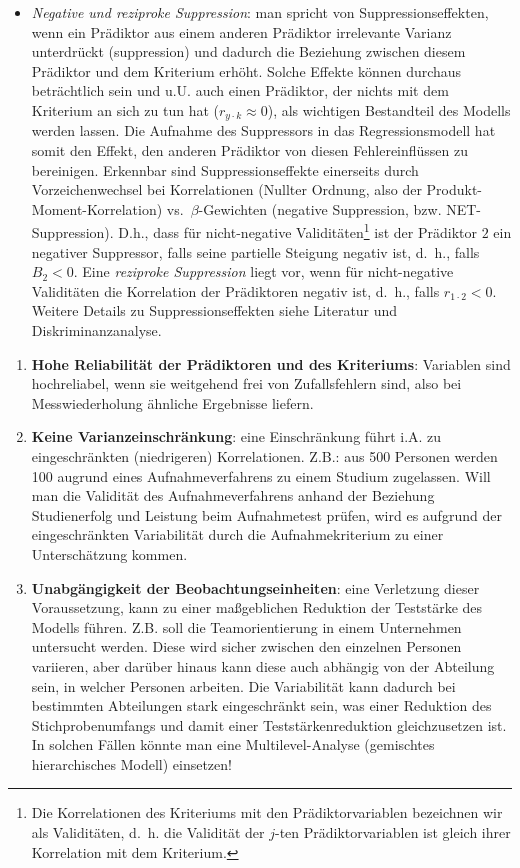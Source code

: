 \documentclass[]{article}
\providecommand{\tightlist}{%
  \setlength{\itemsep}{0pt}\setlength{\parskip}{0pt}}
\let\rmarkdownfootnote\footnote%
\def\footnote{\protect\rmarkdownfootnote}
\begin{document}
\begin{enumerate}
  \begin{itemize}
  \tightlist
  \item
    \emph{Negative und reziproke Suppression}: man spricht von Suppressionseffekten, wenn ein Prädiktor aus einem anderen Prädiktor irrelevante Varianz unterdrückt (suppression) und dadurch die Beziehung zwischen diesem Prädiktor und dem Kriterium erhöht. Solche Effekte können durchaus beträchtlich sein und u.U. auch einen Prädiktor, der nichts mit dem Kriterium an sich zu tun hat (\(r_{y\cdot k} \approx 0\)), als wichtigen Bestandteil des Modells werden lassen. Die Aufnahme des Suppressors in das Regressionsmodell hat somit den Effekt, den anderen Prädiktor von diesen Fehlereinflüssen zu bereinigen. Erkennbar sind Suppressionseffekte einerseits durch Vorzeichenwechsel bei Korrelationen (Nullter Ordnung, also der Produkt-Moment-Korrelation) vs.~\(\beta\)-Gewichten (negative Suppression, bzw. NET-Suppression). D.h., dass für nicht-negative Validitäten\footnote{Die Korrelationen des Kriteriums mit den Prädiktorvariablen bezeichnen wir als Validitäten, d.~h. die Validität der \(j\)-ten Prädiktorvariablen ist gleich ihrer Korrelation mit dem Kriterium.} ist der Prädiktor \(2\) ein negativer Suppressor, falls seine partielle Steigung negativ ist, d.~h., falls \(B_2 < 0\). Eine \emph{reziproke Suppression} liegt vor, wenn für nicht-negative Validitäten die Korrelation der Prädiktoren negativ ist, d.~h., falls \(r_{1\cdot2} < 0\). Weitere Details zu Suppressionseffekten siehe Literatur und Diskriminanzanalyse.
  \end{itemize}
\end{enumerate}

\begin{enumerate}
\def\labelenumi{\arabic{enumi}.}
\setcounter{enumi}{6}
\tightlist
\item
  \textbf{Hohe Reliabilität der Prädiktoren und des Kriteriums}: Variablen sind hochreliabel, wenn sie weitgehend frei von Zufallsfehlern sind, also bei Messwiederholung ähnliche Ergebnisse liefern.
\item
  \textbf{Keine Varianzeinschränkung}: eine Einschränkung führt i.A. zu eingeschränkten (niedrigeren) Korrelationen. Z.B.: aus 500 Personen werden 100 augrund eines Aufnahmeverfahrens zu einem Studium zugelassen. Will man die Validität des Aufnahmeverfahrens anhand der Beziehung Studienerfolg und Leistung beim Aufnahmetest prüfen, wird es aufgrund der eingeschränkten Variabilität durch die Aufnahmekriterium zu einer Unterschätzung kommen.
\item
  \textbf{Unabgängigkeit der Beobachtungseinheiten}: eine Verletzung dieser Voraussetzung, kann zu einer maßgeblichen Reduktion der Teststärke des Modells führen. Z.B. soll die Teamorientierung in einem Unternehmen untersucht werden. Diese wird sicher zwischen den einzelnen Personen variieren, aber darüber hinaus kann diese auch abhängig von der Abteilung sein, in welcher Personen arbeiten. Die Variabilität kann dadurch bei bestimmten Abteilungen stark eingeschränkt sein, was einer Reduktion des Stichprobenumfangs und damit einer Teststärkenreduktion gleichzusetzen ist. In solchen Fällen könnte man eine Multilevel-Analyse (gemischtes hierarchisches Modell) einsetzen!
\end{enumerate}
\end{document}
